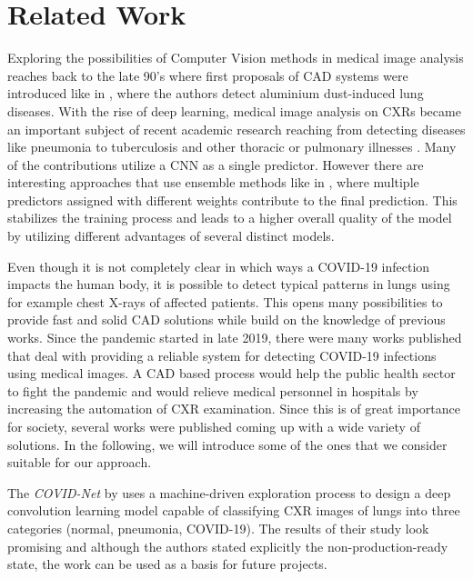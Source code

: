 \section{Related Work}
Exploring the possibilities of Computer Vision methods in medical image analysis reaches back to the late 90's where first proposals of \ac{CAD} systems were introduced like in \autocite{kraus2000aluminium}, where the authors detect aluminium dust-induced lung diseases.
With the rise of deep learning, medical image analysis on \acp{CXR} became an important subject of recent academic research reaching from detecting diseases like pneumonia \autocite{pneumoniaDetection, pneumoniaDetection2, gupta2019evolutionary} to tuberculosis and other thoracic or pulmonary illnesses \autocite{jangam2021deep, vieira2021detecting}. Many of the contributions utilize a \ac{CNN} as a single predictor. However there are interesting approaches that use ensemble methods like in \autocite{livieris2019weighted}, where multiple predictors assigned with different weights contribute to the final prediction. This stabilizes the training process and leads to a higher overall quality of the model by utilizing different advantages of several distinct models.

Even though it is not completely clear in which ways a COVID-19 infection impacts the human body, it is possible to detect typical patterns in lungs using for example chest X-rays of affected patients. This opens many possibilities to provide fast and solid \ac{CAD} solutions while build on the knowledge of previous works.
Since the pandemic started in late 2019, there were many works published that deal with providing a reliable system for detecting COVID-19 infections using medical images. A \ac{CAD} based process would help the public health sector to fight the pandemic and would relieve medical personnel in hospitals by increasing the automation of \ac{CXR} examination. Since this is of great importance for society, several works were published coming up with a wide variety of solutions. In the following, we will introduce some of the ones that we consider suitable for our approach.

The \textit{COVID-Net} \autocite{wang2020covid} by \citeauthor{wang2020covid} uses a machine-driven exploration process to design a deep convolution learning model capable of classifying \ac{CXR} images of lungs into three categories (normal, pneumonia, COVID-19). The results of their study look promising and although the authors stated explicitly the non-production-ready state, the work can be used as a basis for future projects.

